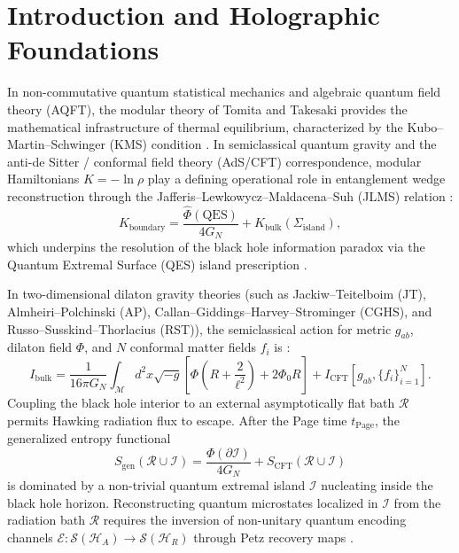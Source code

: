 \documentclass[11pt,a4paper]{article}
\theoremstyle{plain}
\theoremstyle{definition}
\begin{document}
\section{Introduction and Holographic Foundations}
In non-commutative quantum statistical mechanics and algebraic quantum field theory (AQFT), the modular theory of Tomita and Takesaki provides the mathematical infrastructure of thermal equilibrium, characterized by the Kubo--Martin--Schwinger (KMS) condition \cite{Haag1996,BratteliRobinson1997,Takesaki2002}. In semiclassical quantum gravity and the anti-de Sitter / conformal field theory (AdS/CFT) correspondence, modular Hamiltonians $K = -\ln\rho$ play a defining operational role in entanglement wedge reconstruction through the Jafferis--Lewkowycz--Maldacena--Suh (JLMS) relation \cite{Jafferis2016,Faulkner2013,Witten2018Modular}:
\begin{equation}
K_{\mathrm{boundary}} = \frac{\hat{\Phi}(\mathrm{QES})}{4 G_N} + K_{\mathrm{bulk}}(\Sigma_{\mathrm{island}}),
\label{eq:jlms_identity}
\end{equation}
which underpins the resolution of the black hole information paradox via the Quantum Extremal Surface (QES) island prescription \cite{Penington2020,Almheiri2019,Almheiri2020Page}.

In two-dimensional dilaton gravity theories (such as Jackiw--Teitelboim (JT), Almheiri--Polchinski (AP), Callan--Giddings--Harvey--Strominger (CGHS), and Russo--Susskind--Thorlacius (RST)), the semiclassical action for metric $g_{ab}$, dilaton field $\Phi$, and $N$ conformal matter fields $f_i$ is \cite{AlmheiriPolchinski2015,Russo1992}:
\begin{equation}
I_{\mathrm{bulk}} = \frac{1}{16\pi G_N} \int_{\mathcal{M}} d^2x \sqrt{-g} \left[ \Phi \left(R + \frac{2}{\ell^2}\right) + 2\Phi_0 R \right] + I_{\mathrm{CFT}}[g_{ab}, \{f_i\}_{i=1}^N].
\end{equation}
Coupling the black hole interior to an external asymptotically flat bath $\mathcal{R}$ permits Hawking radiation flux to escape. After the Page time $t_{\mathrm{Page}}$, the generalized entropy functional
\begin{equation}
S_{\mathrm{gen}}(\mathcal{R} \cup \mathcal{I}) = \frac{\Phi(\partial\mathcal{I})}{4 G_N} + S_{\mathrm{CFT}}(\mathcal{R} \cup \mathcal{I})
\end{equation}
is dominated by a non-trivial quantum extremal island $\mathcal{I}$ nucleating inside the black hole horizon. Reconstructing quantum microstates localized in $\mathcal{I}$ from the radiation bath $\mathcal{R}$ requires the inversion of non-unitary quantum encoding channels $\mathcal{E}: \mathcal{S}(\mathcal{H}_A) \to \mathcal{S}(\mathcal{H}_R)$ through Petz recovery maps \cite{Petz1986,Petz1988,HaydenPreskill2007,Cotler2019}.
\end{document}
